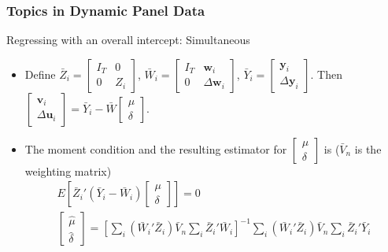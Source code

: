 \documentclass{beamer}
\begin{document}
\begin{frame}
\frametitle{Topics in Dynamic Panel Data}
Regressing with an overall intercept: Simultaneous
\begin{itemize}
\item Define \small{$\bar{Z}_i = \begin{bmatrix}I_T & 0 \\ 0 & Z_i\end{bmatrix}$, $\bar{W}_i=\begin{bmatrix}I_T & \mathbf{w}_i \\ 0 & \Delta\mathbf{w}_i\end{bmatrix}$, $\bar{Y}_i = \begin{bmatrix} \mathbf{y}_i \\ \Delta \mathbf{y}_i\end{bmatrix}$}\normalsize. Then $\begin{bmatrix}\mathbf{v}_i \\ \Delta\mathbf{u}_i \end{bmatrix}=\bar{Y}_i - \bar{W}\begin{bmatrix}\mu \\ \delta\end{bmatrix}$.
\item The moment condition and the resulting estimator for $\begin{bmatrix}\mu \\ \delta\end{bmatrix}$ is ($\bar{V}_n$ is the weighting matrix)
\footnotesize{\begin{gather*}
E\left[\bar{Z}_i'(\bar{Y}_i-\bar{W}_i)\begin{bmatrix}\mu \\ \delta\end{bmatrix}\right]=0\\
\begin{bmatrix}\hat{\mu} \\ \hat{\delta}\end{bmatrix}=\left[\sum_i(\bar{W}_i'\bar{Z}_i)\bar{V}_n\sum_i \bar{Z}_i'\bar{W}_i\right]^{-1}\sum_i(\bar{W}_i'\bar{Z}_i)\bar{V}_n\sum_i \bar{Z}_i'\bar{Y}_i
\end{gather*}}\normalsize
\end{itemize}
\end{frame}
\end{document}
